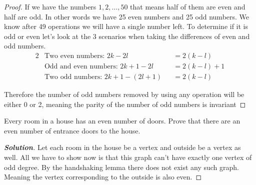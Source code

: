 \documentclass[11pt]{article}
\newenvironment{problem}[2][Problem\!]{\begin{trivlist}
\item[\hskip \labelsep {\bfseries #1}\hskip \labelsep {\bfseries #2}]}{\end{trivlist}}
\newenvironment{solution}{\begin{proof}[\textbf{\textit{Solution}}] }{\end{proof}}
\begin{document}
\begin{proof}
    If we have the numbers $1,2,\dots, 50$ that means half of them are even and half are odd. In other words we have 25 even numbers and 25 odd numbers. We know after 49 operations we will have a single number left. To determine if it is odd or even let's look at the 3 scenarios when taking the differences of even and odd numbers.
    \begin{alignat*}{2}
        &\text{Two even numbers: } 2k - 2l &&= 2(k-l) \\
        &\text{Odd and even numbers: } 2k + 1 - 2l &&= 2(k-l) + 1 \\
        &\text{Two odd numbers: } 2k + 1 - (2l + 1) &&= 2(k-l)
    \end{alignat*}

    Therefore the number of odd numbers removed by using any operation will be either 0 or 2, meaning the parity of the number of odd numbers is invariant
\end{proof}

\begin{tcolorbox}
    \begin{problem}{10/13 IC (50.)} 
        Every room in a house has an even number of doors. Prove that there are an even number of entrance doors to the house. 
    \end{problem}
\end{tcolorbox}
\begin{solution}
    Let each room in the house be a vertex and outside be a vertex as well. All we have to show now is that this graph can't have exactly one vertex of odd degree. By the handshaking lemma there does not exist any such graph. Meaning the vertex corresponding to the outside is also even. 
\end{solution}
\end{document}
